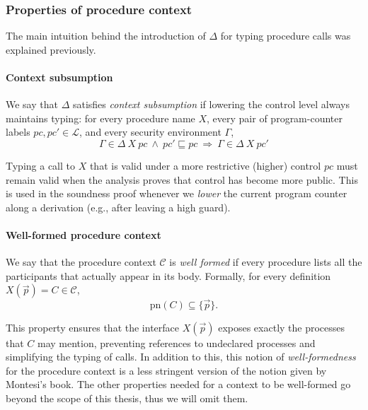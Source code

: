 \documentclass[12pt,a4paper,twoside]{book}
\newcommand{\pn}{\mathrm{pn}}
\newcommand{\MCL}{\mathscr{L}}
\begin{document}
\subsubsection{Properties of procedure context}
The main intuition behind the introduction of $\Delta$ for typing procedure calls was explained previously.

\paragraph{Context subsumption}
We say that \(\Delta\) satisfies \emph{context subsumption} if lowering the control level always maintains typing:
for every procedure name $X$, every pair of program-counter labels $pc,pc'\in \MCL$, and every security environment $\Gamma$, 
\[
  \Gamma \in \Delta~X~pc\ \wedge\ pc' \sqsubseteq pc
  \ \Longrightarrow\
  \Gamma \in \Delta~X~pc'
\]

Typing a call to \(X\) that is valid under a more restrictive (higher) control
  \(pc\) must remain valid when the analysis proves that control has become more public.
  This is used in the soundness proof whenever we \emph{lower} the current program counter along a derivation (e.g., after leaving a high guard).

\paragraph{Well-formed procedure context}
We say that the procedure context \(\mathscr{C}\) is \emph{well formed} if every procedure lists all the participants that actually appear in its body. Formally, for every definition \(X(\vec{p}) = C \in \mathscr{C}\),
\[
  \pn(C) \subseteq \{\vec{p}\}.
\]

This property ensures that the interface \(X(\vec{p})\) exposes exactly the processes that \(C\) may mention, preventing references to undeclared processes and simplifying the typing of calls. In addition to this, this notion of \emph{well-formedness} for the procedure context is a less stringent version of the notion given by Montesi's book\cite{montesi2023introduction}.
The other properties needed for a context to be well-formed go beyond the scope of this thesis, thus we will omit them.
\end{document}
